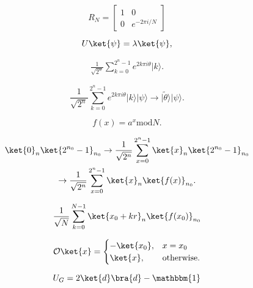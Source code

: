\begin{equation}

R_N = \begin{bmatrix} 1 & 0 \\ 0 & e^{-2\pi i/N} \end{bmatrix}
\end{equation}

\begin{equation}

U \ket{\psi} = \lambda \ket{\psi},
\end{equation}

\begin{align}

\frac{1}{\sqrt{2^n}} \sum_{k=0}^{2^n-1}e^{2k\pi i\theta} \vert k \rangle.
\end{align}

\begin{equation}

\frac{1}{\sqrt{2^n}} \sum_{k=0}^{2^n-1}e^{2k\pi i\theta} \vert k \rangle \vert \psi \rangle \to \vert\tilde{\theta}\rangle \vert \psi \rangle.
\end{equation}

\begin{equation}
\label{eq:shor-f}
f(x)=a^x \text{mod}N. 
\end{equation}

\begin{gather}

\ket{0}_n \ket{2^{n_0}-1}_{n_0} \to
\frac{1}{\sqrt{2^n}} \sum_{x=0}^{2^n-1} \ket{x}_n \ket{2^{n_0}-1}_{n_0} \nonumber\\ 
\to
\frac{1}{\sqrt{2^n}} \sum_{x=0}^{2^n-1} \ket{x}_n \ket{f(x)}_{n_0}.
\end{gather}

\begin{equation}

\frac{1}{\sqrt{N}} \sum_{k=0}^{N-1} \ket{x_0+kr}_n \ket{f(x_0)}_{n_0}
\end{equation}

\begin{equation}

\mathcal{O} \ket{x} =
\begin{cases}
-\ket{x_0}, & x=x_0 \\
\ket{x}, & \textrm{otherwise.} \\
\end{cases}
\end{equation}

\begin{equation}

U_G = 2 \ket{d} \bra{d} - \mathbbm{1}
\end{equation}

